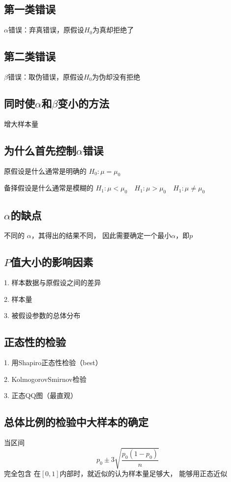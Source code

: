 \documentclass[UTF8,10pt]{book}
\begin{document}
        \subsection{第一类错误}
        $ \alpha $错误：弃真错误，原假设$H_0$为真却拒绝了

        \subsection{第二类错误}	
        $ \beta $错误：取伪错误，原假设$H_0$为伪却没有拒绝

        \subsection{同时使$\alpha$和$\beta$变小的方法}	
        增大样本量

        \subsection{为什么首先控制$\alpha$错误}	
        原假设是什么通常是明确的 $H_0: \mu = \mu_0$ 
        
        备择假设是什么通常是模糊的 $H_1: \mu < \mu_0 \quad H_1: \mu > \mu_0 \quad H_1: \mu \neq \mu_0 $

        \subsection{$ \alpha $的缺点}	

        不同的 $\alpha$，其得出的结果不同， 因此需要确定一个最小$\alpha$，即$p$

        \subsection{$P$值大小的影响因素}	
        1. 样本数据与原假设之间的差异 

        2. 样本量 

        3. 被假设参数的总体分布

        \subsection{正态性的检验}	
        1. 用Shapiro正态性检验（best） 

        2. KolmogorovSmirnov检验 

        3. 正态QQ图（最直观）

        \subsection{总体比例的检验中大样本的确定}	
        当区间 $$ p_0 \pm 3 \sqrt{\frac{p_0(1-p_0)}{n}} $$ 完全包含
        在$[0,1]$内部时，就近似的认为样本量足够大，
        能够用正态近似 
        
\end{document}
